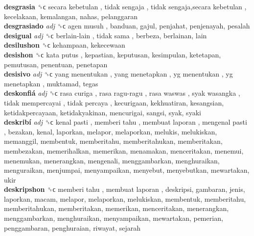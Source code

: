 \textbf{desgrasia} ␝ϲ   secara kebetulan ,  tidak sengaja ,  tidak sengaja,secara kebetulan , kecelakaan, kemalangan, nahas, pelanggaran  \\
\textbf{desgrasiado} \emph{adj}  ␝ϲ   agen musuh , banduan, gajul, penjahat, penjenayah, pesalah  \\
\textbf{desigual} \emph{adj}  ␝ϲ   berlain-lain ,  tidak sama , berbeza, berlainan, lain  \\
\textbf{desilushon} ␝ϲ  kehampaan, kekecewaan  \\
\textbf{desishon} ␝ϲ   kata putus , kepastian, keputusan, kesimpulan, ketetapan, pemutusan, penentuan, penetapan  \\
\textbf{desisivo} \emph{adj}  ␝ϲ   yang menentukan ,  yang menetapkan ,  yg menentukan ,  yg menetapkan , muktamad, tegas  \\
\textbf{deskonfiá} \emph{adj}  ␝ϲ   rasa curiga ,  rasa ragu-ragu ,  rasa waswas ,  syak wasangka ,  tidak mempercayai ,  tidak percaya , kecurigaan, kekhuatiran, kesangsian, ketidakpercayaan, ketidakyakinan, mencurigai, sangsi, syak, syaki  \\
\textbf{deskribí} \emph{adj}  ␝ϲ   kenal pasti ,  memberi tahu ,  membuat laporan ,  mengenal pasti , bezakan, kenal, laporkan, melapor, melaporkan, melukis, melukiskan, memanggil, membentuk, memberitahu, memberitahukan, memberitakan, membezakan, memerihalkan, memerikan, menamakan, menceritakan, menemui, menemukan, menerangkan, mengenali, menggambarkan, menghuraikan, menguraikan, menjumpai, menyampaikan, menyebut, menyebutkan, mewartakan, ukir  \\
\textbf{deskripshon} ␝ϲ   memberi tahu ,  membuat laporan , deskripsi, gambaran, jenis, laporkan, macam, melapor, melaporkan, melukiskan, membentuk, memberitahu, memberitahukan, memberitakan, memerikan, menceritakan, menerangkan, menggambarkan, menghuraikan, menyampaikan, mewartakan, pemerian, penggambaran, penghuraian, riwayat, sejarah  \\
